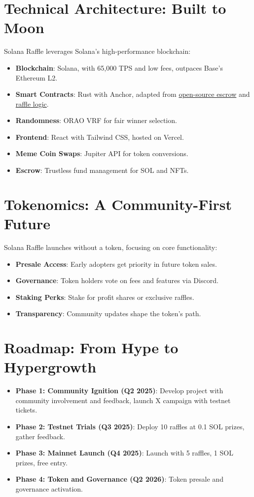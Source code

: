 \documentclass[12pt]{article}
\begin{document}
\section{Technical Architecture: Built to Moon}
Solana Raffle leverages Solana’s high-performance blockchain:
\begin{itemize}
    \item \textbf{Blockchain}: Solana, with 65,000 TPS and low fees, outpaces Base’s Ethereum L2.
    \item \textbf{Smart Contracts}: Rust with Anchor, adapted from \href{https://github.com/kobby-pentangeli/solana-escrow}{open-source escrow} and \href{https://github.com/microgift/nft-raffle}{raffle logic}.
    \item \textbf{Randomness}: ORAO VRF for fair winner selection.
    \item \textbf{Frontend}: React with Tailwind CSS, hosted on Vercel.
    \item \textbf{Meme Coin Swaps}: Jupiter API for token conversions.
    \item \textbf{Escrow}: Trustless fund management for SOL and NFTs.
\end{itemize}

\section{Tokenomics: A Community-First Future}
Solana Raffle launches without a token, focusing on core functionality:
\begin{itemize}
    \item \textbf{Presale Access}: Early adopters get priority in future token sales.
    \item \textbf{Governance}: Token holders vote on fees and features via Discord.
    \item \textbf{Staking Perks}: Stake for profit shares or exclusive raffles.
    \item \textbf{Transparency}: Community updates shape the token’s path.
\end{itemize}

\section{Roadmap: From Hype to Hypergrowth}
\begin{itemize}
    \item \textbf{Phase 1: Community Ignition (Q2 2025)}: Develop project with community involvement and feedback, launch X campaign with testnet tickets.
    \item \textbf{Phase 2: Testnet Trials (Q3 2025)}: Deploy 10 raffles at 0.1 SOL prizes, gather feedback.
    \item \textbf{Phase 3: Mainnet Launch (Q4 2025)}: Launch with 5 raffles, 1 SOL prizes, free entry.
    \item \textbf{Phase 4: Token and Governance (Q2 2026)}: Token presale and governance activation.
\end{itemize}
\end{document}
